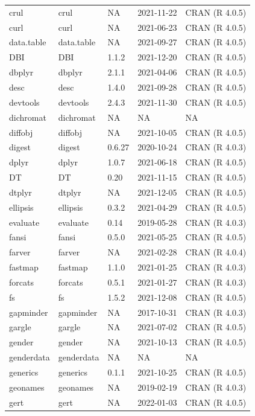 \begin{tabular}{lllll}
\addlinespace
crul & crul & NA & 2021-11-22 & CRAN (R 4.0.5)\\
curl & curl & NA & 2021-06-23 & CRAN (R 4.0.5)\\
data.table & data.table & NA & 2021-09-27 & CRAN (R 4.0.5)\\
DBI & DBI & 1.1.2 & 2021-12-20 & CRAN (R 4.0.5)\\
dbplyr & dbplyr & 2.1.1 & 2021-04-06 & CRAN (R 4.0.5)\\
\addlinespace
desc & desc & 1.4.0 & 2021-09-28 & CRAN (R 4.0.5)\\
devtools & devtools & 2.4.3 & 2021-11-30 & CRAN (R 4.0.5)\\
dichromat & dichromat & NA & NA & NA\\
diffobj & diffobj & NA & 2021-10-05 & CRAN (R 4.0.5)\\
digest & digest & 0.6.27 & 2020-10-24 & CRAN (R 4.0.3)\\
\addlinespace
dplyr & dplyr & 1.0.7 & 2021-06-18 & CRAN (R 4.0.5)\\
DT & DT & 0.20 & 2021-11-15 & CRAN (R 4.0.5)\\
dtplyr & dtplyr & NA & 2021-12-05 & CRAN (R 4.0.5)\\
ellipsis & ellipsis & 0.3.2 & 2021-04-29 & CRAN (R 4.0.5)\\
evaluate & evaluate & 0.14 & 2019-05-28 & CRAN (R 4.0.3)\\
\addlinespace
fansi & fansi & 0.5.0 & 2021-05-25 & CRAN (R 4.0.5)\\
farver & farver & NA & 2021-02-28 & CRAN (R 4.0.4)\\
fastmap & fastmap & 1.1.0 & 2021-01-25 & CRAN (R 4.0.3)\\
forcats & forcats & 0.5.1 & 2021-01-27 & CRAN (R 4.0.3)\\
fs & fs & 1.5.2 & 2021-12-08 & CRAN (R 4.0.5)\\
\addlinespace
gapminder & gapminder & NA & 2017-10-31 & CRAN (R 4.0.3)\\
gargle & gargle & NA & 2021-07-02 & CRAN (R 4.0.5)\\
gender & gender & NA & 2021-10-13 & CRAN (R 4.0.5)\\
genderdata & genderdata & NA & NA & NA\\
generics & generics & 0.1.1 & 2021-10-25 & CRAN (R 4.0.5)\\
\addlinespace
geonames & geonames & NA & 2019-02-19 & CRAN (R 4.0.3)\\
gert & gert & NA & 2022-01-03 & CRAN (R 4.0.5)\\

\end{tabular}
